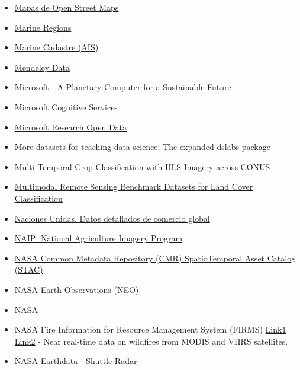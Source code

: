 \documentclass[
]{article}
\begin{document}
\begin{itemize}
{  Earth Observation Dataset}
\item
  \href{http://download.geofabrik.de/}{Mapas de Open Street Maps}
\item
  \href{https://marineregions.org/downloads.php}{Marine Regions}
\item
  \href{https://hub.marinecadastre.gov/}{Marine Cadastre (AIS)}
\item
  \href{https://data.mendeley.com/}{Mendeley Data}
\item
  \href{https://planetarycomputer.microsoft.com/}{Microsoft - A
  Planetary Computer for a Sustainable Future}
\item
  \href{https://www.microsoft.com/cognitive-services/}{Microsoft
  Cognitive Services}
\item
  \href{https://msropendata.com/}{Microsoft Research Open Data}
\item
  \href{https://simplystatistics.org/posts/2019-07-19-more-datasets-for-teaching-data-science-the-expanded-dslabs-package/}{More
  datasets for teaching data science: The expanded dslabs package}
\item
  \href{https://beta.source.coop/repositories/clarkcga/multi-temporal-crop-classification/description/}{Multi-Temporal
  Crop Classification with HLS Imagery across CONUS}
\item
  \href{https://github.com/danfenghong/ISPRS_S2FL}{Multimodal Remote
  Sensing Benchmark Datasets for Land Cover Classification}
\item
  \href{https://comtradeplus.un.org/}{Naciones Unidas. Datos detallados
  de comercio global}
\item
  \href{https://developers.google.com/earth-engine/datasets/catalog/USDA_NAIP_DOQQ}{NAIP:
  National Agriculture Imagery Program}
\item
  \href{https://github.com/opengeos/aws-open-data-stac}{NASA Common
  Metadata Repository (CMR) SpatioTemporal Asset Catalog (STAC)}
\item
  \href{https://neo.gsfc.nasa.gov/}{NASA Earth Observations (NEO)}
\item
  \href{https://nssdc.gsfc.nasa.gov/}{NASA}
\item
  NASA Fire Information for Resource Management System (FIRMS)
  \href{https://firms.modaps.eosdis.nasa.gov/}{Link1}
  \href{https://www.earthdata.nasa.gov/data/tools/firms}{Link2} - Near
  real-time data on wildfires from MODIS and VIIRS satellites.
\item
  \href{https://earthdata.nasa.gov/}{NASA Earthdata} - Shuttle Radar

\end{itemize}
\end{document}
